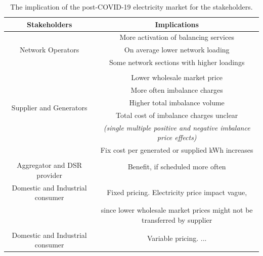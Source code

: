 \documentclass[energies,article,submit,moreauthors,pdftex]{Definitions/mdpi}
\begin{document}
\begin{table}[H]
\caption{The implication of the post-COVID-19 electricity market for the stakeholders.
}\label{table:Implications}
\centering
\begin{tabular}{cc}
\toprule
\textbf{Stakeholders} & \textbf{Implications}	\\
\midrule

\multirow{3}{10em}{Network Operators} 
& More activation of balancing services \\ 
& On average lower network loading \\ 
& Some network sections with higher loadings \\\\ 

\multirow{5}{10em}{Supplier and Generators} 
& Lower wholesale market price \\
& More often imbalance charges \\ 
& Higher total imbalance volume \\ 
& Total cost of imbalance charges unclear \\
& \textit{(single multiple positive and negative imbalance price effects)} \\ 
& Fix cost per generated or supplied kWh increases \\\\

\multirow{3}{10em}{Aggregator and DSR provider} 
& Benefit, if scheduled more often \\ \\ \\

\multirow{1}{10em}{Domestic and Industrial consumer} 
& Fixed pricing. Electricity price impact vague,\\ & since lower wholesale market prices might not be transferred by supplier \\\\ 


\multirow{2}{10em}{Domestic and Industrial consumer} 
& Variable pricing. ... \\\\ 



\bottomrule
\end{tabular}
\end{table}


\end{document}
